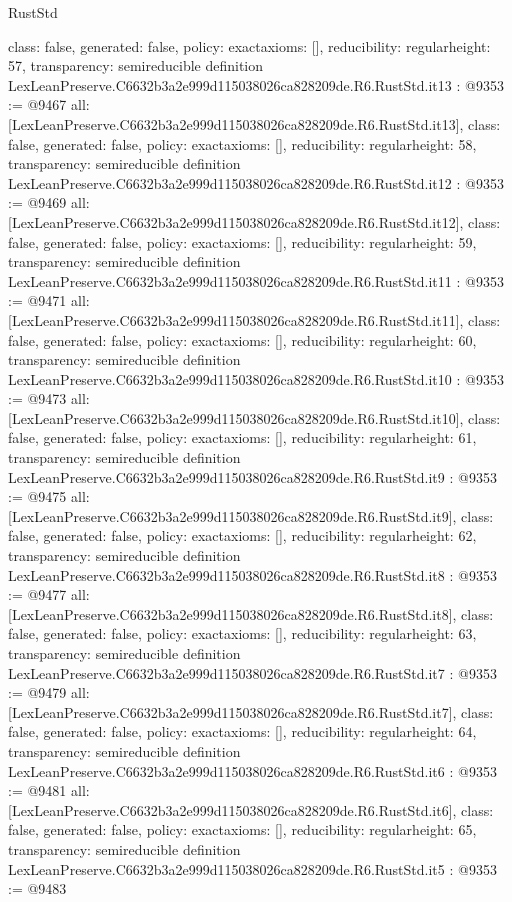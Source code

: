\begin{lexlean}{RustStd}
\begin{coremodule}
{  class: false,
  generated: false,
  policy: exact{axioms: []},
  reducibility: regular{height: 57},
  transparency: semireducible
}
definition LexLeanPreserve.C6632b3a2e999d115038026ca828209de.R6.RustStd.it13 : @9353 := @9467 {
  all: [LexLeanPreserve.C6632b3a2e999d115038026ca828209de.R6.RustStd.it13],
  class: false,
  generated: false,
  policy: exact{axioms: []},
  reducibility: regular{height: 58},
  transparency: semireducible
}
definition LexLeanPreserve.C6632b3a2e999d115038026ca828209de.R6.RustStd.it12 : @9353 := @9469 {
  all: [LexLeanPreserve.C6632b3a2e999d115038026ca828209de.R6.RustStd.it12],
  class: false,
  generated: false,
  policy: exact{axioms: []},
  reducibility: regular{height: 59},
  transparency: semireducible
}
definition LexLeanPreserve.C6632b3a2e999d115038026ca828209de.R6.RustStd.it11 : @9353 := @9471 {
  all: [LexLeanPreserve.C6632b3a2e999d115038026ca828209de.R6.RustStd.it11],
  class: false,
  generated: false,
  policy: exact{axioms: []},
  reducibility: regular{height: 60},
  transparency: semireducible
}
definition LexLeanPreserve.C6632b3a2e999d115038026ca828209de.R6.RustStd.it10 : @9353 := @9473 {
  all: [LexLeanPreserve.C6632b3a2e999d115038026ca828209de.R6.RustStd.it10],
  class: false,
  generated: false,
  policy: exact{axioms: []},
  reducibility: regular{height: 61},
  transparency: semireducible
}
definition LexLeanPreserve.C6632b3a2e999d115038026ca828209de.R6.RustStd.it9 : @9353 := @9475 {
  all: [LexLeanPreserve.C6632b3a2e999d115038026ca828209de.R6.RustStd.it9],
  class: false,
  generated: false,
  policy: exact{axioms: []},
  reducibility: regular{height: 62},
  transparency: semireducible
}
definition LexLeanPreserve.C6632b3a2e999d115038026ca828209de.R6.RustStd.it8 : @9353 := @9477 {
  all: [LexLeanPreserve.C6632b3a2e999d115038026ca828209de.R6.RustStd.it8],
  class: false,
  generated: false,
  policy: exact{axioms: []},
  reducibility: regular{height: 63},
  transparency: semireducible
}
definition LexLeanPreserve.C6632b3a2e999d115038026ca828209de.R6.RustStd.it7 : @9353 := @9479 {
  all: [LexLeanPreserve.C6632b3a2e999d115038026ca828209de.R6.RustStd.it7],
  class: false,
  generated: false,
  policy: exact{axioms: []},
  reducibility: regular{height: 64},
  transparency: semireducible
}
definition LexLeanPreserve.C6632b3a2e999d115038026ca828209de.R6.RustStd.it6 : @9353 := @9481 {
  all: [LexLeanPreserve.C6632b3a2e999d115038026ca828209de.R6.RustStd.it6],
  class: false,
  generated: false,
  policy: exact{axioms: []},
  reducibility: regular{height: 65},
  transparency: semireducible
}
definition LexLeanPreserve.C6632b3a2e999d115038026ca828209de.R6.RustStd.it5 : @9353 := @9483 {
}
\end{coremodule}
\end{lexlean}
